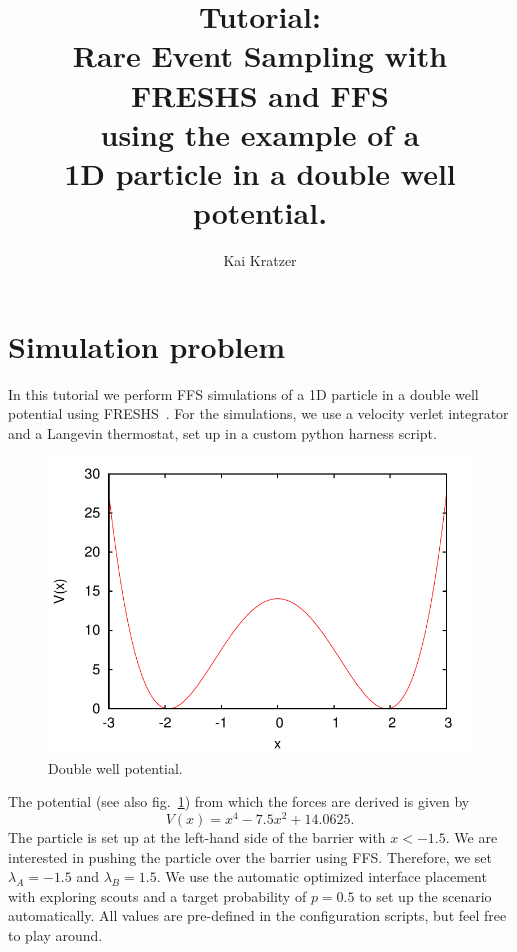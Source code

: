 \documentclass[a4paper,oneside]{article}
\title{Tutorial:\\Rare Event Sampling with FRESHS and FFS\\using the example of a\\1D particle in a double well potential.}
\author{Kai Kratzer}
\begin{document}

\maketitle
\tableofcontents

\newpage

\section{Simulation problem}

In this tutorial we perform FFS simulations of a 1D particle in a double well potential using FRESHS~\cite{freshs}. For the simulations, we use a velocity verlet integrator and a Langevin thermostat, set up in a custom python harness script.
\begin{figure}
 \centering
 \includegraphics[width=0.9\linewidth]{fig/potential}
 \caption{Double well potential.}
 \label{fig:dw}
\end{figure}
The potential (see also fig.~\ref{fig:dw}) from which the forces are derived is given by
\begin{equation}
 V(x)=x^4-7.5x^2+14.0625.
\end{equation}
The particle is set up at the left-hand side of the barrier with $x<-1.5$. We are interested in pushing the particle over the barrier using FFS. Therefore, we set $\lambda_A=-1.5$ and $\lambda_B=1.5$. We use the automatic optimized interface placement~\cite{optiflux} with exploring scouts and a target probability of $p=0.5$ to set up the scenario automatically. All values are pre-defined in the configuration scripts, but feel free to play around.
\end{document}
